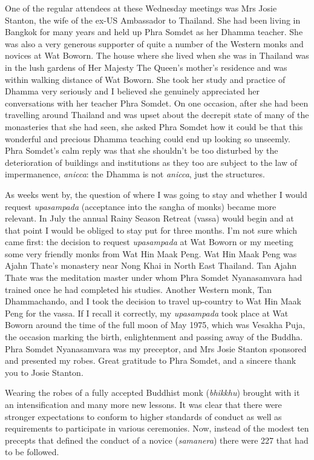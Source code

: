 One of the regular attendees at these Wednesday meetings was Mrs Josie
Stanton, the wife of the ex-US \mbox{Ambassador} to Thailand. She had
been living in Bangkok for many years and held up Phra Somdet as her
Dhamma teacher. She was also a very generous supporter of quite a number
of the Western monks and novices at Wat Boworn. The house where she
lived when she was in Thailand was in the lush gardens of Her Majesty
The Queen's mother's residence and was within walking distance of Wat
Boworn. She took her study and practice of Dhamma very seriously and I
believed she genuinely appreciated her conversations with her teacher Phra Somdet.
On one occasion, after she had been travelling around Thailand and was
upset about the decrepit state of many of the monasteries that she had
seen, she asked Phra Somdet how it could be that this wonderful and
precious Dhamma teaching could end up looking so unseemly. Phra Somdet's
calm reply was that she shouldn't be too disturbed by the deterioration
of buildings and institutions as they too are subject to the law of
impermanence, \emph{anicca}: the Dhamma is not \emph{anicca}, just the
structures.

As weeks went by, the question of where I was going to stay and whether
I would request \emph{upasampada} (acceptance into the sangha of monks)
became more relevant. In July the annual Rainy Season Retreat (vassa)
would begin and at that point I would be obliged to stay put for three
months. I'm not sure which came first: the decision to request
\emph{upasampada} at Wat Boworn or my meeting some very friendly monks
from Wat Hin Maak Peng. Wat Hin Maak Peng was Ajahn Thate's monastery
near Nong Khai in North East Thailand. Tan Ajahn Thate was the
meditation master under whom Phra Somdet Nyanasamvara had trained once
he had completed his studies. Another Western monk, Tan Dhammachando,
and I took the decision to travel up-country to Wat Hin Maak Peng for
the vassa. If I recall it correctly, my \emph{upasampada} took place at
Wat Boworn around the time of the full moon of May 1975, which was
Vesakha Puja, the occasion marking the birth, enlightenment and passing
away of the Buddha. Phra Somdet Nyanasamvara was my preceptor, and Mrs
Josie Stanton sponsored and presented my robes. Great gratitude to Phra
Somdet, and a sincere thank you to Josie Stanton.

Wearing the robes of a fully accepted Buddhist monk (\emph{bhikkhu})
brought with it an intensification and many more new lessons. It was
clear that there were stronger expectations to conform to higher
standards of conduct as well as requirements to participate in various
ceremonies. Now, instead of the modest ten precepts that defined the
conduct of a novice (\emph{samanera}) there were 227 that had to be
followed.

